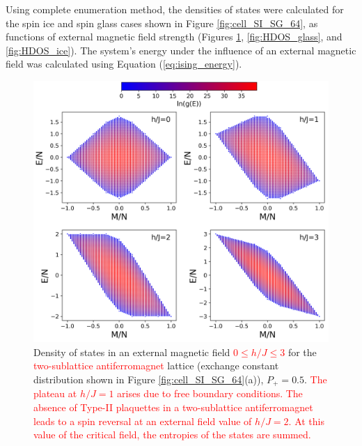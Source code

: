 \documentclass[preprint,12pt]{elsarticle}
\begin{document}
	Using complete enumeration method, the densities of states were calculated for the spin ice and spin glass cases shown in Figure \ref{fig:cell_SI_SG_64}, as functions of external magnetic field strength (Figures \ref{fig:HDOS_ice_1}, \ref{fig:HDOS_glass}, and \ref{fig:HDOS_ice}).
	The system's energy under the influence of an external magnetic field was calculated using Equation (\ref{eq:ising_energy}).
	
	\begin{figure}[H]
		\centering
		\includegraphics[width=1\linewidth]{pictures/HDOS_SI_64_J0_1.png}
		\caption{Density of states in an external magnetic field \textcolor{red}{$0\leq h/J \leq 3$} for the \textcolor{red}{two-sublattice antiferromagnet} lattice (exchange constant distribution shown in Figure \ref{fig:cell_SI_SG_64}(a)), $P_+ = 0.5$. \textcolor{red}{The plateau at $h/J=1$ arises due to free boundary conditions. The absence of Type-II plaquettes in a two-sublattice antiferromagnet leads to a spin reversal at an external field value of $h/J=2$. At this value of the critical field, the entropies of the states are summed.}}
		\label{fig:HDOS_ice_1}
	\end{figure}
	
\end{document}
